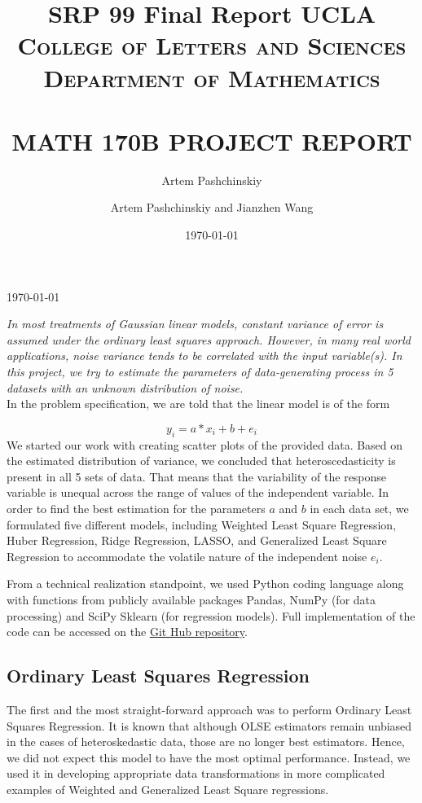 \documentclass[letter,12pt]{article} %
\author{Artem Pashchinskiy}
\title{SRP 99 Final Report}
\date{\today}
\title{ \normalsize \textsc{UCLA College of Letters and Sciences \\ Department of Mathematics}  %
	\\[2.0cm]                                                   %
	\HRule{0.5pt} \\                                        %
	\LARGE \textbf{\uppercase{Math 170B Project  Report}}   %
	\HRule{2pt} \\ [0.5cm]                              %
	\printauthor                                    %
}
\author{
	Artem Pashchinskiy and Jianzhen Wang
}
\makeatletter
\def\printtitle{%
	{\centering \@title\par}}
\makeatother
\begin{document}
	\thispagestyle{empty}               %
	
	\printtitle                                 %
	\vfill
	\begin{center} \today \end{center}
	
	\newpage
	
	\textit{In most treatments of Gaussian linear models, constant variance of error is assumed under the ordinary least squares approach. However, in many real world applications, noise variance tends to be correlated with the input variable(s). In this project, we try to estimate the parameters of data-generating process in 5 datasets with an unknown distribution of noise. }\\
	
	In the problem specification, we are told that the linear model is of the form 
	
	$$y_i = a*x_i + b + e_i$$
	We started our work with creating scatter plots of the provided data. Based on the estimated distribution of variance,  we concluded that  heteroscedasticity is present in all 5 sets of data. That means that the variability of the response variable is unequal across the range of values of the independent variable. In order to find the best estimation for the parameters $a$ and $b$ in each data set, we formulated five different models, including Weighted Least Square Regression, Huber Regression, Ridge Regression, LASSO, and Generalized Least Square Regression to accommodate the volatile nature of the independent noise $e_i$.
	
	From a technical realization standpoint, we used Python coding language along with functions from publicly available packages Pandas, NumPy (for data processing) and SciPy Sklearn (for regression models). Full implementation of the code can be accessed on the \href{https://github.com/apashch/Heterosked-reg-models}{\underline{Git Hub repository}}.
	
	\subsection*{Ordinary Least Squares Regression}
	The first and the most straight-forward approach was to perform Ordinary Least Squares Regression. It is known that although OLSE estimators remain unbiased in the cases of heteroskedastic data, those are no longer best estimators. Hence, we did not expect this model to have the most optimal performance. Instead, we used it in developing appropriate data transformations in more complicated examples of Weighted and Generalized Least Square regressions.
	
\end{document}
